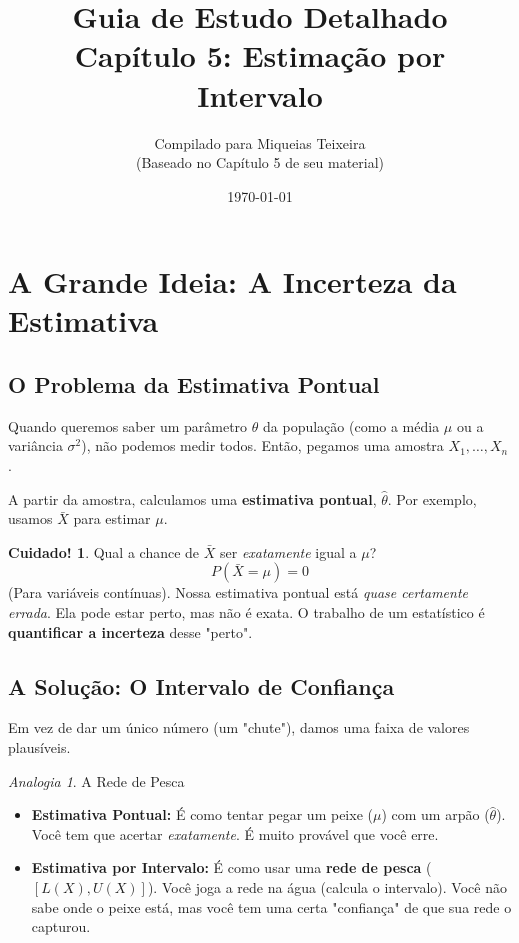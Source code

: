 \documentclass[12pt, a4paper]{article}
\title{Guia de Estudo Detalhado \\ \Large Capítulo 5: Estimação por Intervalo}
\author{Compilado para Miqueias Teixeira \\ \small (Baseado no Capítulo 5 de seu material)}
\date{\today}
\theoremstyle{definition} %
\newtheorem{aviso}{Cuidado!}[section]
\theoremstyle{remark} %
\newtheorem{analogia}{Analogia}[section]
\begin{document}
\maketitle
\tableofcontents
\newpage

\section{A Grande Ideia: A Incerteza da Estimativa}

\subsection{O Problema da Estimativa Pontual}
Quando queremos saber um parâmetro $\theta$ da população (como a média $\mu$ ou a variância $\sigma^2$), não podemos medir todos. Então, pegamos uma amostra $X_1, \dots, X_n$.

A partir da amostra, calculamos uma \textbf{estimativa pontual}, $\hat{\theta}$. Por exemplo, usamos $\bar{X}$ para estimar $\mu$.

\begin{aviso}
    Qual a chance de $\bar{X}$ ser \textit{exatamente} igual a $\mu$?
    $$ P(\bar{X} = \mu) = 0 $$
    (Para variáveis contínuas). Nossa estimativa pontual está \textit{quase certamente errada}. Ela pode estar perto, mas não é exata. O trabalho de um estatístico é \textbf{quantificar a incerteza} desse "perto".
\end{aviso}

\subsection{A Solução: O Intervalo de Confiança}
Em vez de dar um único número (um "chute"), damos uma faixa de valores plausíveis.

\begin{analogia}{A Rede de Pesca}
    \begin{itemize}
        \item \textbf{Estimativa Pontual:} É como tentar pegar um peixe ($\mu$) com um arpão ($\hat{\theta}$). Você tem que acertar \textit{exatamente}. É muito provável que você erre.
        \item \textbf{Estimativa por Intervalo:} É como usar uma \textbf{rede de pesca} ($[L(X), U(X)]$). Você joga a rede na água (calcula o intervalo). Você não sabe onde o peixe está, mas você tem uma certa "confiança" de que sua rede o capturou.
    \end{itemize}
\end{analogia}
\end{document}

